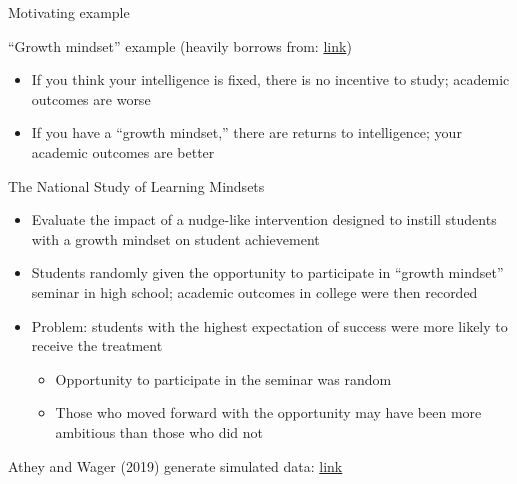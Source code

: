 \documentclass[compress, 8pt]{beamer}
\begin{document}





\begin{frame}{Motivating example}


``Growth mindset'' example (heavily borrows from: \href{https://matheusfacure.github.io/python-causality-handbook/11-Propensity-Score.html}{link})
\begin{itemize}
    \item If you think your intelligence is fixed, there is no incentive to study; academic outcomes are worse
    \item If you have a ``growth mindset,'' there are returns to intelligence; your academic outcomes are better
\end{itemize}

The National Study of Learning Mindsets
\begin{itemize}
    \item Evaluate the impact of a nudge-like intervention designed to instill students with a growth mindset on student achievement
\item Students randomly given the opportunity to participate in ``growth mindset'' seminar in high school; academic outcomes in college were then recorded
\item Problem: students with the highest expectation of success were more likely to receive the treatment
\begin{itemize}
    \item Opportunity to participate in the seminar was random
    \item Those who moved forward with the opportunity may have been more ambitious than those who did not
\end{itemize}
\end{itemize}

Athey and Wager (2019) generate simulated data: \href{https://arxiv.org/pdf/1902.07409}{link}

\end{frame}
\end{document}
